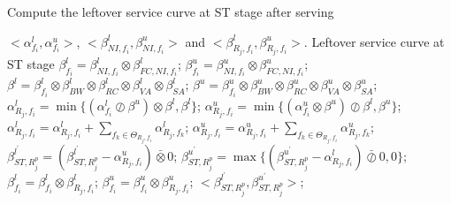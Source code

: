 \documentclass[10pt,journal]{IEEEtran}
\begin{document}
\begin{algorithm}
\caption{Compute the leftover service curve at ST stage after serving}
\label{alg:leftoverscl}
\begin{algorithmic}[1]
\Require $<\alpha_{f_i}^l,\alpha^u_{f_i}>$, $<\beta_{NI,f_i}^l,\beta_{NI,f_i}^u>$ and $<\beta_{R_j,f_i}^l,\beta_{R_j,f_i}^u>$.
\Ensure Leftover service curve at ST stage
\State $\beta_{f_i}^l=\beta_{NI,f_i}^l\otimes\beta_{FC,NI,f_i}^l$; $\beta_{f_i}^u=\beta_{NI,f_i}^u\otimes\beta_{FC,NI,f_i}^u$;
        \State $\beta^l=\beta^l_{f_i}\otimes\beta_{BW}^l\otimes\beta_{RC}^l\otimes\beta_{VA}^l\otimes\beta_{SA}^l$;
        \State $\beta^u=\beta^u_{f_i}\otimes\beta_{BW}^u\otimes\beta_{RC}^u\otimes\beta_{VA}^u\otimes\beta_{SA}^u$;
        \State $\alpha^l_{R_j,f_i}=\min\{(\alpha^l_{f_i}\oslash\beta^u)\otimes\beta^l,\beta^l\}$;
        \State $\alpha^u_{R_j,f_i}=\min\{(\alpha^u_{f_i}\otimes\beta^u)\oslash\beta^l,\beta^u\}$;
            \State $\alpha^l_{R_j,f_i}=\alpha^l_{R_j,f_i}+\sum_{f_k\in\Theta_{R_j,f_i}}\alpha^l_{R_j,f_k}$;
            \State $\alpha^u_{R_j,f_i}=\alpha^u_{R_j,f_i}+\sum_{f_k\in\Theta_{R_j,f_i}}\alpha^u_{R_j,f_k}$;
            \State $\beta^{l^\prime}_{ST,R_j^{p}}=(\beta^{l^\prime}_{ST,R_j^{p}}-\alpha^u_{R_j,f_i})\bar{\otimes}0$;
            \State $\beta^{u^\prime}_{ST,R_j^{p}}=\max\{(\beta^{u^\prime}_{ST,R_j^{p}}-\alpha^l_{R_j,f_i})\bar{\oslash}0,0\}$;
        \EndIf
    \EndIf
    \State $\beta_{f_i}^l=\beta_{f_i}^l\otimes\beta^l_{R_j,f_i}$; $\beta_{f_i}^u=\beta_{f_i}^u\otimes\beta^u_{R_j,f_i}$;
    \State \Return $<\beta^{l^\prime}_{ST,R_j^{p}},\beta^{u^\prime}_{ST,R_j^{p}}>$;
\EndFor
\EndFunction
\end{algorithmic}
\end{algorithm}
\end{document}
